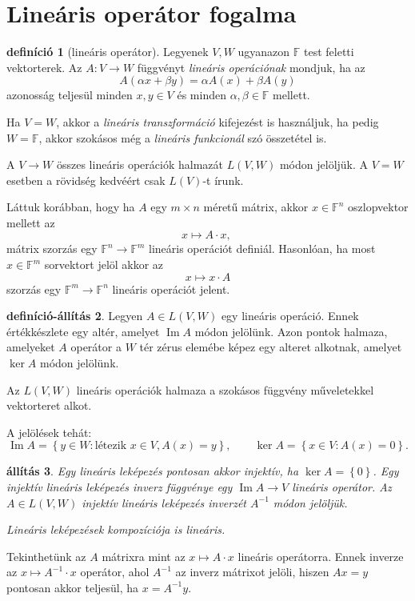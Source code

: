 \documentclass[a4paper, showtrims]{memoir}
\theoremstyle{plain}
\newtheorem{proposition}{állítás}[chapter]
\theoremstyle{remark}
\theoremstyle{definition}
\newtheorem{definition}[proposition]{definíció}
\newtheorem{defprop}[proposition]{definíció-állítás}
\DeclareMathOperator{\im}{Im}
\begin{document}
\section{Lineáris operátor fogalma}
\begin{definition}[lineáris operátor]
	Legyenek $V,W$ ugyanazon $\mathbb{F}$ test feletti vektorterek.
	Az $A:V\to W$ függvényt \emph{lineáris operációnak} mondjuk,
	ha az
	\begin{displaymath}
		A\left( \alpha x+\beta y \right)=
		\alpha A\left( x \right)+\beta A\left( y \right)
	\end{displaymath}
	azonosság teljesül minden $x,y\in V$ és minden $\alpha,\beta\in\mathbb{F}$ mellett.

	Ha $V=W$, akkor a \emph{lineáris transzformáció} kifejezést is használjuk,
	ha pedig $W=\mathbb{F}$,
	akkor szokásos még a \emph{lineáris funkcionál} szó összetétel is.

	A $V\to W$ összes lineáris operációk halmazát $L\left( V,W \right)$ módon jelöljük.
	A $V=W$ esetben a rövidség kedvéért csak $L\left( V \right)$-t írunk.
\end{definition}
Láttuk korábban, hogy ha $A$ egy $m\times n$ méretű mátrix,
akkor $x\in\mathbb{F}^n$ oszlopvektor mellett az
\[
	x\mapsto A\cdot x,\
\]
mátrix szorzás egy $\mathbb{F}^n\to\mathbb{F}^m$ lineáris operációt definiál.
Hasonlóan,
ha most $x\in\mathbb{F}^m$ sorvektort jelöl akkor az
\[
	x\mapsto x\cdot A
\]
szorzás egy $\mathbb{F}^m\to\mathbb{F}^n$ lineáris operációt jelent.

\begin{defprop}
	Legyen $A\in L\left( V,W \right)$ egy lineáris operáció.
	Ennek értékkészlete egy altér,
	amelyet $\im A$ módon jelölünk.
	Azon pontok halmaza,
	amelyeket $A$ operátor a $W$ tér zérus elemébe képez egy alteret alkotnak,
	amelyet $\ker A$ módon jelölünk.

	Az $L\left( V,W \right)$ lineáris operációk halmaza a szokásos függvény műveletekkel vektorteret alkot.
\end{defprop}
A jelölések tehát:
\[
	\im A=\left\{ y\in W:\text{létezik } x\in V, A(x)=y \right\},
	\qquad
	\ker A=
	\left\{ x\in V:A\left( x \right)=0 \right\}.
\]
\begin{proposition}
	Egy lineáris leképezés pontosan akkor injektív, ha $\ker A=\left\{ 0 \right\}$.
	Egy injektív lineáris leképezés inverz függvénye egy $\im A\to V$ lineáris operátor.
	Az $A\in L\left( V,W \right)$ injektív lineáris leképezés inverzét $A^{-1}$ módon jelöljük.

	Lineáris leképezések kompozíciója is lineáris.
\end{proposition}
Tekinthetünk az $A$ mátrixra mint az $x\mapsto A\cdot x$ lineáris operátorra.
Ennek inverze az $x\mapsto A^{-1}\cdot x$ operátor,
ahol $A^{-1}$ az inverz mátrixot jelöli, hiszen
$Ax=y$ pontosan akkor teljesül, ha $x=A^{-1}y$.
\end{document}

